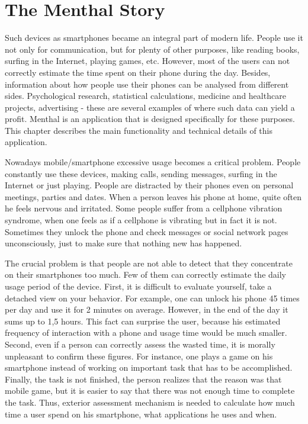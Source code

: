 \chapter{The Menthal Story}
\label{chap:menthal_story}
Such devices as smartphones became an integral part of modern life.
People use it not only for communication, but for plenty of other purposes, like reading books, surfing in the Internet, playing games, etc.
However, most of the users can not correctly estimate the time spent on their phone during the day.
Besides, information about how people use their phones can be analysed from different sides.
Psychological research, statistical calculations, medicine and healthcare projects, advertising - these are several examples of where such data can yield a profit.
Menthal is an application that is designed specifically for these purposes.
This chapter describes the main functionality and technical details of this application.

Nowadays mobile/smartphone excessive usage becomes a critical problem.
People constantly use these devices, making calls, sending messages, surfing in the Internet or just playing.
People are distracted by their phones even on personal meetings, parties and dates.
When a person leaves his phone at home, quite often he feels nervous and irritated.
Some people suffer from a cellphone vibration syndrome, when one feels as if a cellphone is vibrating but in fact it is not.
Sometimes they unlock the phone and check messages or social network pages unconsciously, just to make sure that nothing new has happened. 

The crucial problem is that people are not able to detect that they concentrate on their smartphones too much.
Few of them can correctly estimate the daily usage period of the device.
First, it is difficult to evaluate yourself, take a detached view on your behavior.
For example, one can unlock his phone 45 times per day and use it for 2 minutes on average.
However, in the end of the day it sums up to 1,5 hours.
This fact can surprise the user, because his estimated frequency of interaction with a phone and usage time would be much smaller.
Second, even if a person can correctly assess the wasted time, it is morally unpleasant to confirm these figures.
For instance, one plays a game on his smartphone instead of working on important task that has to be accomplished.
Finally, the task is not finished, the person realizes that the reason was that mobile game, but it is easier to say that there was not enough time to complete the task.  
Thus, exterior assessment mechanism is needed to calculate how much time a user spend on his smartphone, what applications he uses and when.    

